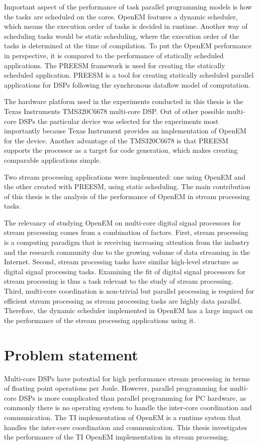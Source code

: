 Important aspect of the performance of task parallel programming models is how the tasks are scheduled on the cores. OpenEM features a dynamic scheduler, which means the execution order of tasks is decided in runtime. Another way of scheduling tasks would be static scheduling, where the execution order of the tasks is determined at the time of compilation. To put the OpenEM performance in perspective, it is compared to the performance of statically scheduled applications. The PREESM framework is used for creating the statically scheduled application. PREESM is a tool for creating statically scheduled parallel applications for DSPs following the synchronous dataflow model of computation.

The hardware platform used in the experiments conducted in this thesis is the Texas Instruments TMS320C6678 multi-core DSP. Out of other possible multi-core DSPs the particular device was selected for the experiments most importantly because Texas Instrument provides an implementation of OpenEM for the device. Another advantage of the TMS320C6678 is that PREESM supports the processor as a target for code generation, which makes creating comparable applications simple.

Two stream processing applications were implemented: one using OpenEM and the other created with PREESM, using static scheduling. The main contribution of this thesis is the analysis of the performance of OpenEM in stream processing tasks.

The relevancy of studying OpenEM on multi-core digital signal processors for stream processing comes from a combination of factors. First, stream processing is a computing paradigm that is receiving increasing attention from the industry and the research community due to the growing volume of data streaming in the Internet. Second, stream processing tasks have similar high-level structure as digital signal processing tasks. Examining the fit of digital signal processors for stream processing is thus a task relevant to the study of stream processing. Third, multi-core coordination is non-trivial but parallel processing is required for efficient stream processing as stream processing tasks are highly data parallel. Therefore, the dynamic scheduler implemented in OpenEM has a large impact on the performance of the stream processing applications using it.

\section{Problem statement}
\label{section:problem-statement}
Multi-core DSPs have potential for high performance stream processing in terms of floating point operations per Joule. However, parallel programming for multi-core DSPs is more complicated than parallel programming for PC hardware, as commonly there is no operating system to handle the inter-core coordination and communication. The TI implementation of OpenEM is a runtime system that handles the inter-core coordination and communication. This thesis investigates the performance of the TI OpenEM implementation in stream processing.

